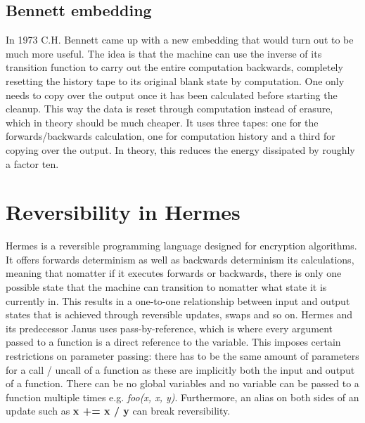\subsection{Bennett embedding}
In 1973 C.H. Bennett came up with a new embedding that would turn out to be much more useful\cite{Bennett1973LogicalRO}.
The idea is that the machine can use the inverse of its transition function to carry out the entire computation backwards, completely resetting the history tape to its original blank state by computation. One only needs to copy over the output once it has been calculated before starting the cleanup. This way the data is reset through computation instead of erasure, which in theory should be much cheaper.
It uses three tapes: one for the forwards/backwards calculation, one for computation history and a third for copying over the output. 
In theory, this reduces the energy dissipated by roughly a factor ten.

\section{Reversibility in Hermes}
Hermes is a reversible programming language designed for encryption algorithms. It offers forwards determinism as well as backwards determinism its calculations, meaning that nomatter if it executes forwards or backwards,  there is only one possible state that the machine can transition to nomatter what state it is currently in.
This results in a one-to-one relationship between input and output states that is achieved through reversible updates, swaps and so on.
Hermes and its predecessor Janus uses pass-by-reference, which is where every argument passed to a function is a direct reference to the variable.
This imposes certain restrictions on parameter passing: there has to be the same amount of parameters for a call / uncall of a function as these are implicitly both the input and output of a function.
There can be no global variables and no variable can be passed to a function multiple times e.g. \emph{foo(x, x, y)}.
Furthermore, an alias on both sides of an update such as \textbf{x += x / y} can break reversibility.

